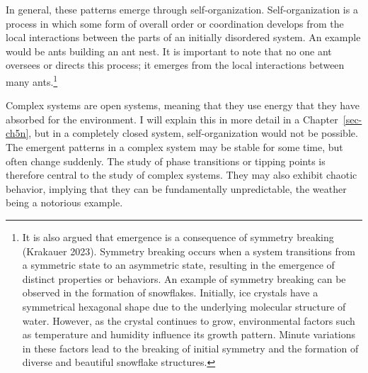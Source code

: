 \documentclass[
  a4paper,
  DIV=11,
  numbers=noendperiod]{scrreprt}
\begin{document}
In general, these patterns emerge through self-organization.
Self-organization is a process in which some form of overall order or
coordination develops from the local interactions between the parts of
an initially disordered system. An example would be ants building an ant
nest. It is important to note that no one ant oversees or directs this
process; it emerges from the local interactions between many
ants.\footnote{It is also argued that emergence is a consequence of
  symmetry breaking (Krakauer 2023). Symmetry breaking occurs when a
  system transitions from a symmetric state to an asymmetric state,
  resulting in the emergence of distinct properties or behaviors. An
  example of symmetry breaking can be observed in the formation of
  snowflakes. Initially, ice crystals have a symmetrical hexagonal shape
  due to the underlying molecular structure of water. However, as the
  crystal continues to grow, environmental factors such as temperature
  and humidity influence its growth pattern. Minute variations in these
  factors lead to the breaking of initial symmetry and the formation of
  diverse and beautiful snowflake structures.}

Complex systems are open systems, meaning that they use energy that they
have absorbed for the environment. I will explain this in more detail in
a Chapter~\ref{sec-ch5n}, but in a completely closed system,
self-organization would not be possible. The emergent patterns in a
complex system may be stable for some time, but often change suddenly.
The study of phase transitions or tipping points is therefore central to
the study of complex systems. They may also exhibit chaotic behavior,
implying that they can be fundamentally unpredictable, the weather being
a notorious example.
\end{document}
